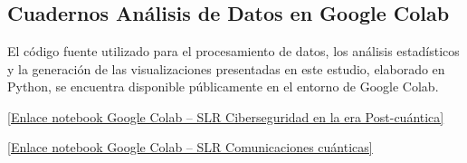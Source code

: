 \chapter{\appendixname}

\section{Cuadernos Análisis de Datos en Google Colab}
El código fuente utilizado para el procesamiento de datos, los análisis
estadísticos y la generación de las visualizaciones presentadas en este
estudio, elaborado en Python, se encuentra disponible públicamente en el
entorno de Google Colab.
\vspace{1em} 
\par \href{https://colab.research.google.com/drive/19fjULORUjsRlmKM24SduokurfjqVDilD?usp=sharing}{[Enlace notebook Google Colab – SLR Ciberseguridad en la era Post-cuántica]}
\par \href{https://colab.research.google.com/drive/1_-VODXPSZ7oe_9a_WL-DUWAQnQ6uA9tI?usp=sharing}{[Enlace notebook Google Colab – SLR Comunicaciones cuánticas]}